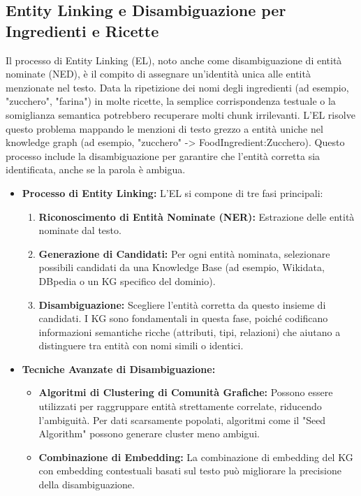 \documentclass[a4paper, 11pt]{article}
\begin{document}
\subsection{Entity Linking e Disambiguazione per Ingredienti e Ricette}
Il processo di Entity Linking (EL), noto anche come disambiguazione di entità nominate (NED), è il compito di assegnare un'identità unica alle entità menzionate nel testo. \cite{entity_linking_wiki} Data la ripetizione dei nomi degli ingredienti (ad esempio, "zucchero", "farina") in molte ricette, la semplice corrispondenza testuale o la somiglianza semantica potrebbero recuperare molti chunk irrilevanti. L'EL risolve questo problema mappando le menzioni di testo grezzo a entità uniche nel knowledge graph (ad esempio, "zucchero" -> FoodIngredient:Zucchero). Questo processo include la disambiguazione \cite{entity_linking_wiki} per garantire che l'entità corretta sia identificata, anche se la parola è ambigua.
\begin{itemize}
    \item \textbf{Processo di Entity Linking:} L'EL si compone di tre fasi principali:
    \begin{enumerate}
        \item \textbf{Riconoscimento di Entità Nominate (NER):} Estrazione delle entità nominate dal testo. \cite{entity_linking_wiki}
        \item \textbf{Generazione di Candidati:} Per ogni entità nominata, selezionare possibili candidati da una Knowledge Base (ad esempio, Wikidata, DBpedia o un KG specifico del dominio). \cite{entity_linking_wiki}
        \item \textbf{Disambiguazione:} Scegliere l'entità corretta da questo insieme di candidati. \cite{entity_linking_wiki} I KG sono fondamentali in questa fase, poiché codificano informazioni semantiche ricche (attributi, tipi, relazioni) che aiutano a distinguere tra entità con nomi simili o identici. \cite{understanding_kg}
    \end{enumerate}
    \item \textbf{Tecniche Avanzate di Disambiguazione:}
    \begin{itemize}
        \item \textbf{Algoritmi di Clustering di Comunità Grafiche:} Possono essere utilizzati per raggruppare entità strettamente correlate, riducendo l'ambiguità. \cite{kg_entity_disambiguation} Per dati scarsamente popolati, algoritmi come il "Seed Algorithm" possono generare cluster meno ambigui. \cite{kg_entity_disambiguation}
        \item \textbf{Combinazione di Embedding:} La combinazione di embedding del KG con embedding contestuali basati sul testo può migliorare la precisione della disambiguazione. \cite{ned_with_kg_harvard}
    \end{itemize}
\end{itemize}
\end{document}
